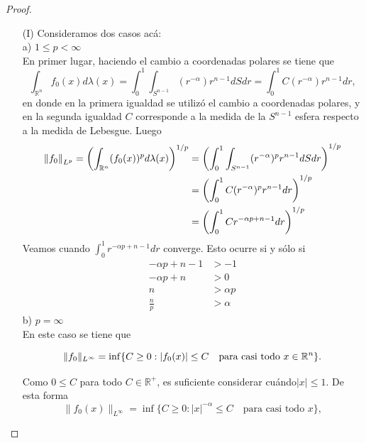 \begin{proof}
\begin{enumerate}
    \item[(I)]Consideramos dos casos acá:\\
a) $1 \leq p < \infty$ \\
En primer lugar, haciendo el cambio a coordenadas polares se tiene que
\[
\int_{\mathbb{R}^n} f_0(x) d\lambda(x)=\int_0^1\int_{S^{n-1}}(r^{-\alpha})r^{n-1}dSdr=\int_0^1C(r^{-\alpha})r^{n-1}dr,
\]
en donde en la primera igualdad se utilizó el cambio a coordenadas polares, y en la segunda igualdad $C$ corresponde a la medida de la $S^{n-1}$ esfera respecto a la medida de Lebesgue. Luego
\begin{align*}
\left\|f_0\right\|_{L^p}=\left( \int_{\mathbb{R}^n} (f_0(x))^p d\lambda(x) \right)^{1/p}&= \left( \int_0^1 \int_{S^{n-1}} (r^{-\alpha})^p r^{n-1} dS dr \right)^{1/p}\\&= \left( \int_0^1 C (r^{-\alpha})^p r^{n-1} dr \right)^{1/p}\\&= \left( \int_0^1 C r^{-\alpha p + n - 1} dr \right)^{1/p} 
\end{align*}
Veamos cuando $\displaystyle \int_0^1 r^{-\alpha p + n - 1} dr$ converge. Esto ocurre si y sólo si
\begin{align*}
-\alpha p + n - 1 &> -1 \\
-\alpha p + n &> 0 \\
n &> \alpha p \\
\frac{n}{p} &> \alpha
\end{align*}
b) $p = \infty$ \\ En este caso se tiene que

\[\|f_0\|_{L^\infty} = \inf \{ C \geq 0 : |f_0(x)| \leq C \quad \text{para casi todo } x \in \mathbb{R}^{n}\}.\]

Como $0 \leq C$ para todo $ C \in \mathbb{R}^+$, es suficiente considerar
cuándo$|x| \leq 1$. De esta forma
\[\|f_0(x)\|_{L^\infty} = \inf \{ C \geq 0 : |x|^{-\alpha} \leq C \quad \text{para casi todo } x \},\]


\end{enumerate}
\end{proof}
